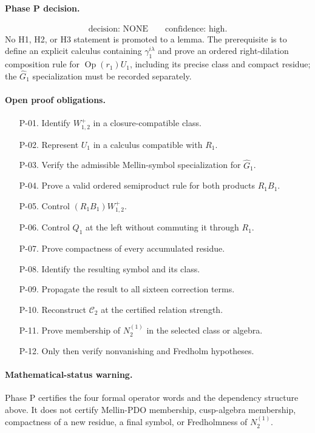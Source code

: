 \paragraph{Phase P decision.}
\[
\boxed{\text{decision: NONE}\qquad\text{confidence: high}.}
\]
No H1, H2, or H3 statement is promoted to a lemma.  The prerequisite is to
define an explicit calculus containing \(\gamma_1^{i\lambda}\) and prove an
ordered right-dilation composition rule for
\(\operatorname{Op}(r_1)U_1\), including its precise class and compact
residue; the \(\widehat G_1\) specialization must be recorded separately.

\paragraph{Open proof obligations.}
\begin{enumerate}
\item[P-01.] Identify \(W_{1,2}^{+}\) in a closure-compatible class.
\item[P-02.] Represent \(U_1\) in a calculus compatible with \(R_1\).
\item[P-03.] Verify the admissible Mellin-symbol specialization for
  \(\widehat G_1\).
\item[P-04.] Prove a valid ordered semiproduct rule for both products
  \(R_1B_1\).
\item[P-05.] Control \((R_1B_1)W_{1,2}^{+}\).
\item[P-06.] Control \(Q_1\) at the left without commuting it through
  \(R_1\).
\item[P-07.] Prove compactness of every accumulated residue.
\item[P-08.] Identify the resulting symbol and its class.
\item[P-09.] Propagate the result to all sixteen correction terms.
\item[P-10.] Reconstruct \(\mathcal C_2\) at the certified relation strength.
\item[P-11.] Prove membership of \(N_2^{(1)}\) in the selected class or
  algebra.
\item[P-12.] Only then verify nonvanishing and Fredholm hypotheses.
\end{enumerate}

\paragraph{Mathematical-status warning.}
Phase P certifies the four formal operator words and the dependency structure
above.  It does not certify Mellin-PDO membership, cusp-algebra membership,
compactness of a new residue, a final symbol, or Fredholmness of
\(N_2^{(1)}\).
